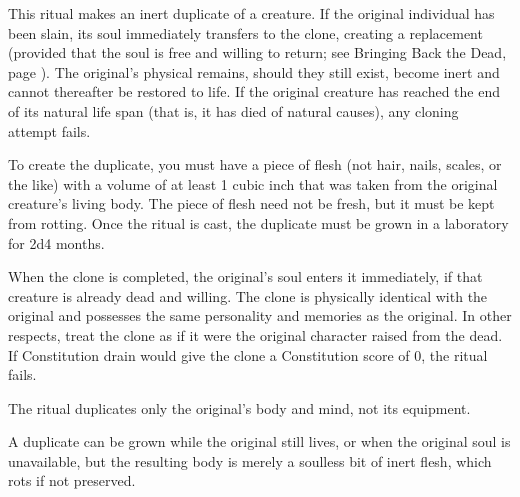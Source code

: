 \begin{spelleffect}
This ritual makes an inert duplicate of a creature. If the original individual has been slain, its soul immediately transfers to the clone, creating a replacement (provided that the soul is free and willing to return; see Bringing Back the Dead, page \pageref{Bringing Back the Dead}). The original's physical remains, should they still exist, become inert and cannot thereafter be restored to life. If the original creature has reached the end of its natural life span (that is, it has died of natural causes), any cloning attempt fails.
\par To create the duplicate, you must have a piece of flesh (not hair, nails, scales, or the like) with a volume of at least 1 cubic inch that was taken from the original creature's living body. The piece of flesh need not be fresh, but it must be kept from rotting. Once the ritual is cast, the duplicate must be grown in a laboratory for 2d4 months.
\par When the clone is completed, the original's soul enters it immediately, if that creature is already dead and willing. The clone is physically identical with the original and possesses the same personality and memories as the original. In other respects, treat the clone as if it were the original character raised from the dead. If Constitution drain would give the clone a Constitution score of 0, the ritual fails.
\end{spelleffect}
\begin{spellnotes}
\par The ritual duplicates only the original's body and mind, not its equipment.
\par A duplicate can be grown while the original still lives, or when the original soul is unavailable, but the resulting body is merely a soulless bit of inert flesh, which rots if not preserved.
\end{spellnotes}

